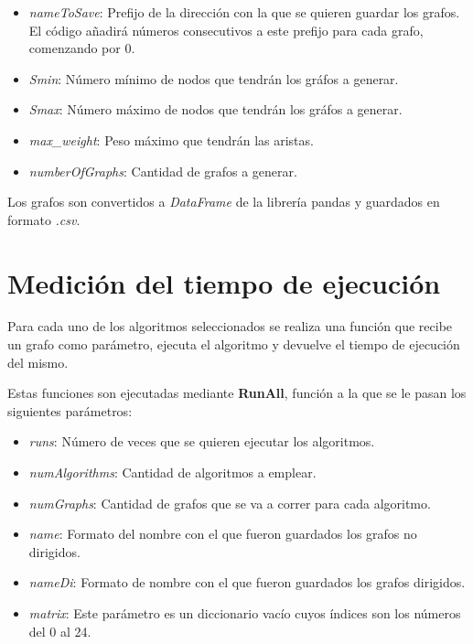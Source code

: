 \documentclass{article}
\begin{document}
\begin{itemize}
\item \textit{nameToSave}: Prefijo de la dirección con la que se quieren guardar los grafos. El código añadirá números consecutivos a este prefijo para cada grafo, comenzando por 0.
\item \textit{Smin}: Número mínimo de nodos que tendrán los gráfos a generar.
\item \textit{Smax}: Número máximo de nodos que tendrán los gráfos a generar.
\item \textit{max\_weight}: Peso máximo que tendrán las aristas.
\item \textit{numberOfGraphs}: Cantidad de grafos a generar.
\end{itemize}

Los grafos son convertidos a \textit{DataFrame} de la librería pandas \cite{pandas} y guardados en formato \textit{.csv}.
 

\section*{Medición del tiempo de ejecución}

Para cada uno de los algoritmos seleccionados se realiza una función que recibe un grafo como parámetro, ejecuta el algoritmo y devuelve el tiempo de ejecución del mismo. 

 

Estas funciones son ejecutadas mediante \textbf{RunAll}, función a la que se le pasan los siguientes parámetros:
\begin{itemize}
\item \textit{runs}: Número de veces que se quieren ejecutar los algoritmos.
\item \textit{numAlgorithms}: Cantidad de algoritmos a emplear.
\item \textit{numGraphs}: Cantidad de grafos que se va a correr para cada algoritmo.
\item \textit{name}: Formato del nombre con el que fueron guardados los grafos no dirigidos.
\item \textit{nameDi}: Formato de nombre con el que fueron guardados los grafos dirigidos.
\item \textit{matrix}: Este parámetro es un diccionario vacío cuyos índices son los números del 0 al 24.
\end{itemize}
\end{document}
